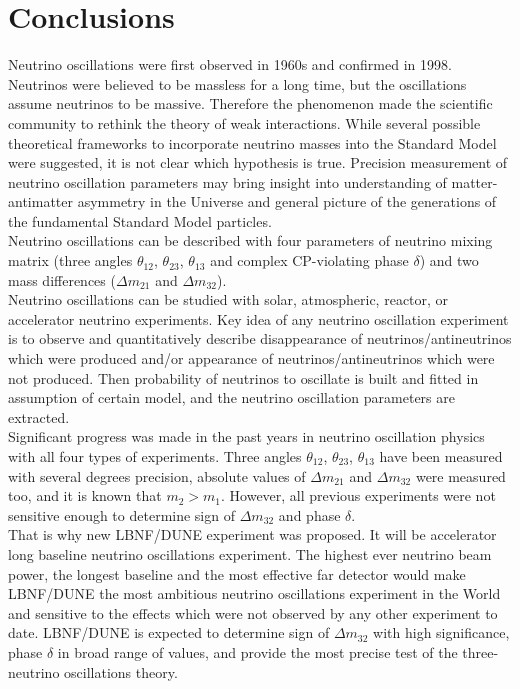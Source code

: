 \section{Conclusions}

Neutrino oscillations were first observed in 1960s and confirmed in 1998. Neutrinos were believed to be massless for a long time, but the oscillations assume neutrinos to be massive. Therefore the phenomenon made the scientific community to rethink the theory of weak interactions. While several possible theoretical frameworks to incorporate neutrino masses into the Standard Model were suggested, it is not clear which hypothesis is true. Precision measurement of neutrino oscillation parameters may bring insight into understanding of matter-antimatter asymmetry in the Universe and general picture of the generations of the fundamental Standard Model particles. \\

Neutrino oscillations can be described with four parameters of neutrino mixing matrix (three angles $\theta_{12}$, $\theta_{23}$, $\theta_{13}$ and complex CP-violating phase $\delta$) and two mass differences (${\Delta}m_{21}$ and ${\Delta}m_{32}$).\\

Neutrino oscillations can be studied with solar, atmospheric, reactor, or accelerator neutrino experiments. Key idea of any neutrino oscillation experiment is to observe and quantitatively describe disappearance of neutrinos/antineutrinos which were produced and/or appearance of neutrinos/antineutrinos which were not produced. Then probability of neutrinos to oscillate is built and fitted in assumption of certain model, and the neutrino oscillation parameters are extracted.\\

Significant progress was made in the past years in neutrino oscillation physics with all four types of experiments. Three angles $\theta_{12}$, $\theta_{23}$, $\theta_{13}$ have been measured with several degrees precision, absolute values of ${\Delta}m_{21}$ and ${\Delta}m_{32}$ were measured too, and it is known that $m_2 > m_1$. However, all previous experiments were not sensitive enough to determine sign of ${\Delta}m_{32}$ and phase $\delta$.\\

That is why new LBNF/DUNE experiment was proposed. It will be accelerator long baseline neutrino oscillations experiment. The highest ever neutrino beam power, the longest baseline and the most effective far detector would make LBNF/DUNE the most ambitious neutrino oscillations experiment in the World and sensitive to the effects which were not observed by any other experiment to date. LBNF/DUNE is expected to determine sign of ${\Delta}m_{32}$ with high significance, phase $\delta$ in broad range of values, and provide the most precise test of the three-neutrino oscillations theory.\\


